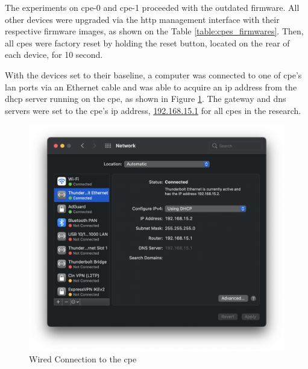 The experiments on \gls{cpe}-0 and \gls{cpe}-1 proceeded with the outdated firmware. All other devices were upgraded via the \gls{http} management interface with their respective firmware images, as shown on the Table \ref{table:cpes_firmwares}. Then, all \glspl{cpe} were factory reset by holding the reset button, located on the rear of each device, for 10 second.

\begin{table}[h]
    \caption{Firmwares of the \gls{cpe}s}
    \label{table:cpes_firmwares}
\end{table}

With the devices set to their baseline, a computer was connected to one of \gls{cpe}’s \gls{lan} ports via an Ethernet cable and was able to acquire an \gls{ip} address from the \gls{dhcp} server running on the \gls{cpe}, as shown in Figure \ref{figure:wired_connection_to_the_cpe}. The gateway and \gls{dns} servers were set to the \gls{cpe}’s \gls{ip} address, \url{192.168.15.1} for all \glspl{cpe} in the research.

\begin{figure}[h]
    \centering
    \includegraphics[width=\linewidth]{contents/cpes-and-research-data/preparation/wired-connection-to-the-cpe.png}
    \caption{Wired Connection to the \gls{cpe}}
    \label{figure:wired_connection_to_the_cpe}
\end{figure}

\FloatBarrier
